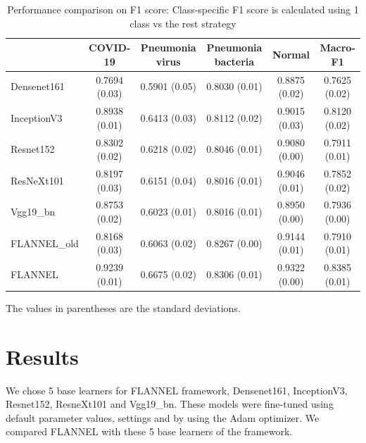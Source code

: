 \documentclass{sigkddExp}
\begin{document}
\begin{table}
    \centering
    \caption{Performance comparison on F1 score: Class-specific F1 score is calculated using 1 class vs the rest strategy}
    \label{table:resultstats}
    \begin{tabular}{ lccccc } \hline
                      & COVID-19      & Pneumonia virus & Pneumonia bacteria &
        Normal        & Macro-F1                                               \\ \hline

        Densenet161   & 0.7694 (0.03) & 0.5901 (0.05)   & 0.8030 (0.01)      &
        0.8875 (0.02) & 0.7625 (0.02)                                          \\
        InceptionV3   & 0.8938 (0.01) & 0.6413 (0.03)   & 0.8112 (0.02)      &
        0.9015 (0.03) & 0.8120 (0.02)                                          \\
        Resnet152     & 0.8302 (0.02) & 0.6218 (0.02)   & 0.8046 (0.01)      &
        0.9080 (0.00) & 0.7911 (0.01)                                          \\
        ResNeXt101    & 0.8197 (0.03) & 0.6151 (0.04)   & 0.8016 (0.01)      &
        0.9046 (0.01) & 0.7852 (0.02)                                          \\
        Vgg19\_bn     & 0.8753 (0.02) & 0.6023 (0.01)   & 0.8016 (0.01)      &
        0.8950 (0.00) & 0.7936 (0.00)                                          \\
        FLANNEL\_old  & 0.8168 (0.03) & 0.6063 (0.02)   & 0.8267 (0.00)      &
        0.9144 (0.01) & 0.7910 (0.01)                                          \\
        FLANNEL       & 0.9239 (0.01) & 0.6675 (0.02)   & 0.8306 (0.01)      &
        0.9322 (0.00) & 0.8385 (0.01)                                          \\ \hline
    \end{tabular}\par
    \bigskip
    The values in parentheses are the standard deviations.
\end{table}

\section{Results}

We chose 5 base learners for FLANNEL framework, Densenet161, InceptionV3,
Resnet152, ResneXt101 and Vgg19\_bn. These models were fine-tuned using default
parameter values, settings and by using the Adam optimizer. We compared FLANNEL
with these 5 base learners of the framework.
\end{document}
